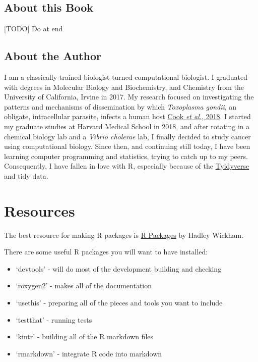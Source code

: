 \documentclass[]{book}
\providecommand{\tightlist}{%
  \setlength{\itemsep}{0pt}\setlength{\parskip}{0pt}}
\begin{document}
\hypertarget{about-this-book}{%
\subsection*{About this Book}\label{about-this-book}}

{[}TODO{]} Do at end

\hypertarget{about-the-author}{%
\subsection*{About the Author}\label{about-the-author}}

I am a classically-trained biologist-turned computational biologist. I graduated with degrees in Molecular Biology and Biochemistry, and Chemistry from the University of California, Irvine in 2017. My research focused on investigating the patterns and mechanisms of dissemination by which \emph{Toxoplasma gondii}, an obligate, intracellular parasite, infects a human host \href{https://www.ncbi.nlm.nih.gov/pubmed/29295815}{Cook \emph{et al.}, 2018}. I started my graduate studies at Harvard Medical School in 2018, and after rotating in a chemical biology lab and a \emph{Vibrio cholerae} lab, I finally decided to study cancer using computational biology. Since then, and continuing still today, I have been learning computer programming and statistics, trying to catch up to my peers. Consequently, I have fallen in love with R, especially because of the \href{https://www.tidyverse.org}{Tyidyverse} and tidy data.

\hypertarget{resources}{%
\section*{Resources}\label{resources}}

The best resource for making R packages is \href{https://r-pkgs.org/index.html}{R Packages} by Hadley Wickham.

There are some useful R packages you will want to have installed:

\begin{itemize}
\tightlist
\item
  `devtools' - will do most of the development building and checking
\item
  `roxygen2' - makes all of the documentation
\item
  `usethis' - preparing all of the pieces and tools you want to include
\item
  `testthat' - running tests
\item
  `kintr' - building all of the R markdown files
\item
  `rmarkdown' - integrate R code into markdown
\end{itemize}
\end{document}
